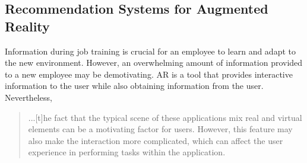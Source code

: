 \documentclass{aifyp}
\begin{document}
\subsection{Recommendation Systems for Augmented Reality}
Information during job training is crucial for an employee to learn and adapt to the new environment. However, an overwhelming amount of information provided to a new employee may be demotivating. AR is a tool that provides interactive information to the user while also obtaining information from the user. Nevertheless, 
\begin{quote}...[t]he fact that the typical scene of these applications mix real and virtual elements can be a motivating factor for users. However, this feature may also make the interaction more complicated, which can affect the user experience in performing tasks within the application.\cite{8114443}
\end{quote}
\end{document}

